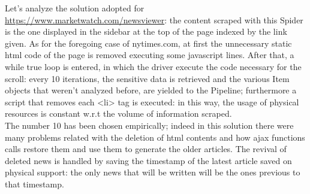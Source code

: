 \par 
Let's analyze the solution adopted for \url{https://www.marketwatch.com/newsviewer}: the content scraped with this Spider is the one displayed in the sidebar at the top of the page indexed by the link given. As for the foregoing case of nytimes.com, at first the unnecessary static html code of the page is removed executing some javascript lines. After that, a while true loop is entered, in which the driver execute the code necessary for the scroll: every 10 iterations, the sensitive data is retrieved and the various Item objects that weren't analyzed before, are yielded to the Pipeline; furthermore a script that removes each <li> tag is executed: in this way, the usage of physical resources is constant w.r.t the volume of information scraped. \\
The number 10 has been chosen empirically; indeed in this solution there were many problems related with the deletion of html contents and how ajax functions calls restore them and use them to generate the older articles. The revival of deleted news is handled by saving the timestamp of the latest article saved on physical support: the only news that will be written will be the ones previous to that timestamp.
\par 
\par  
